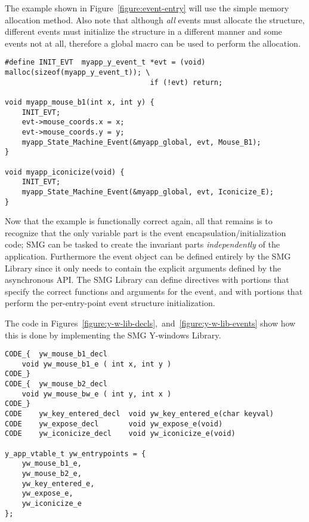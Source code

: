 The example shown in Figure~\ref{figure:event-entry} will use the
simple memory allocation method.  Also note that although {\em all}
events must allocate the structure, different events must initialize
the structure in a different manner and some events not at all,
therefore a global macro can be used to perform the allocation.


\begin{figure*}
\begin{verbatim}
#define INIT_EVT  myapp_y_event_t *evt = (void) malloc(sizeof(myapp_y_event_t)); \
                                  if (!evt) return;

void myapp_mouse_b1(int x, int y) {
    INIT_EVT;
    evt->mouse_coords.x = x;
    evt->mouse_coords.y = y;
    myapp_State_Machine_Event(&myapp_global, evt, Mouse_B1);
}

void myapp_iconicize(void) {
    INIT_EVT;
    myapp_State_Machine_Event(&myapp_global, evt, Iconicize_E);
}
\end{verbatim}
\caption{Event Entry Actions}\label{figure:event-entry}
\end{figure*}

Now that the example is functionally correct again, all that
remains is to recognize that the only variable part is the event
encapsulation/initialization code; SMG can be tasked to create the
invariant parts {\em independently} of the application.   Furthermore the
event object can be defined entirely by the SMG Library since it only
needs to contain the explicit arguments defined by the asynchronous API.
The SMG Library can define \EVENT directives with \code{entry_code}
portions that specify the correct functions and arguments for the event,
and with \code{start_code} portions that perform the per-entry-point
event structure initialization.

The code in
Figures~\ref{figure:y-w-lib-decls},~and~\ref{figure:y-w-lib-events}
show how this is done by implementing the SMG Y-windows Library.

\begin{figure*}
\begin{verbatim}
CODE_{  yw_mouse_b1_decl
    void yw_mouse_b1_e ( int x, int y )
CODE_}
CODE_{  yw_mouse_b2_decl
    void yw_mouse_bw_e ( int y, int x )
CODE_}
CODE    yw_key_entered_decl  void yw_key_entered_e(char keyval)
CODE    yw_expose_decl       void yw_expose_e(void)
CODE    yw_iconicize_decl    void yw_iconicize_e(void)

y_app_vtable_t yw_entrypoints = {
    yw_mouse_b1_e,
    yw_mouse_b2_e,
    yw_key_entered_e,
    yw_expose_e,
    yw_iconicize_e
};
\end{verbatim}
\caption{Y-windows SMG Library declarations}\label{figure:y-w-lib-decls}
\end{figure*}

